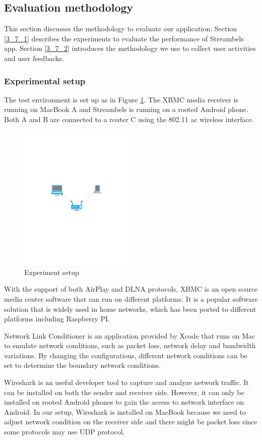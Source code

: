 \subsection{Evaluation methodology\label{3_7}}
This section discusses the methodology to evaluate our application. Section
\ref{3_7_1} describes the experiments to evaluate the performance of Streambels
app. Section \ref{3_7_2} introduces the methodology we use to collect user
activities and user feedbacks.

\subsubsection{Experimental setup\label{3_7_1}}
The test environment is set up as in Figure \ref{setup}. The XBMC
media receiver is running on MacBook A and Streambels is running on a rooted Android phone. Both A and B are connected to a router C using the 802.11 ac wireless interface. \\
\begin{figure}[htb]
\centering \includegraphics[height=7cm]{charts/experiment_setup}
\caption{Experiment setup \label{setup}}
\end{figure}
With the support of both AirPlay and DLNA protocols, XBMC is an open source media center software that can run on different platforms. It is a popular software solution that is widely used in home networks, which has been ported to different platforms including Raspberry PI.

Network Link Conditioner is an application provided by Xcode that runs on Mac to emulate network conditions, such as packet loss, network delay and bandwidth variations. By changing the configurations, different network conditions can be set to determine the boundary network conditions.

Wireshark is an useful developer tool to capture and analyze network traffic. It can be installed on both the sender and receiver side. However, it can only be installed on rooted Android phones to gain the access to network interface on Android. In our setup, Wireshark is installed on MacBook because we need to adjust network condition on the receiver side and there might be packet loss since some protocols may use UDP protocol.

